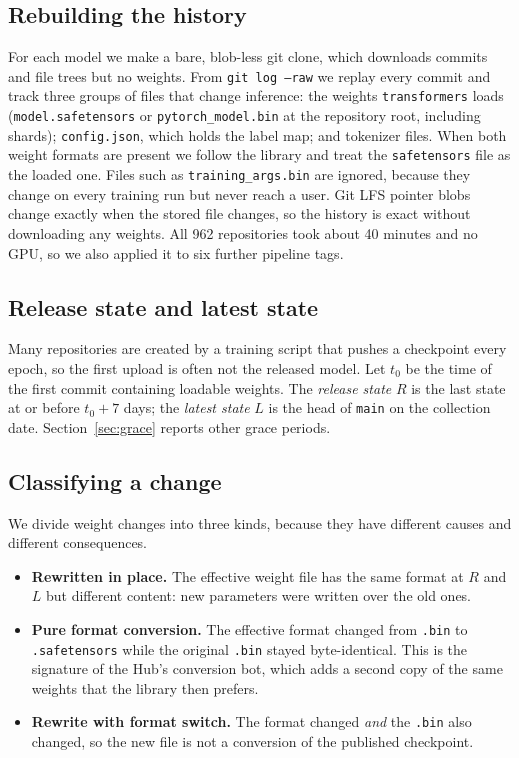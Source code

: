 \documentclass[conference]{IEEEtran}
\newcommand{\code}[1]{\texttt{#1}}
\begin{document}
\subsection{Rebuilding the history}
For each model we make a bare, blob-less git clone, which downloads commits and file trees but no weights. From \code{git log --raw} we replay every commit and track three groups of files that change inference: the weights \code{transformers} loads (\code{model.safetensors} or \code{pytorch\_model.bin} at the repository root, including shards); \code{config.json}, which holds the label map; and tokenizer files. When both weight formats are present we follow the library and treat the \code{safetensors} file as the loaded one. Files such as \code{training\_args.bin} are ignored, because they change on every training run but never reach a user. Git LFS pointer blobs change exactly when the stored file changes, so the history is exact without downloading any weights. All 962 repositories took about 40 minutes and no GPU, so we also applied it to six further pipeline tags.

\subsection{Release state and latest state}
Many repositories are created by a training script that pushes a checkpoint every epoch, so the first upload is often not the released model. Let $t_0$ be the time of the first commit containing loadable weights. The \emph{release state} $R$ is the last state at or before $t_0 + 7$ days; the \emph{latest state} $L$ is the head of \code{main} on the collection date. Section~\ref{sec:grace} reports other grace periods.

\subsection{Classifying a change}\label{sec:kinds}
We divide weight changes into three kinds, because they have different causes and different consequences.

\begin{itemize}
\item \textbf{Rewritten in place.} The effective weight file has the same format at $R$ and $L$ but different content: new parameters were written over the old ones.
\item \textbf{Pure format conversion.} The effective format changed from \code{.bin} to \code{.safetensors} while the original \code{.bin} stayed byte-identical. This is the signature of the Hub's conversion bot, which adds a second copy of the same weights that the library then prefers.
\item \textbf{Rewrite with format switch.} The format changed \emph{and} the \code{.bin} also changed, so the new file is not a conversion of the published checkpoint.
\end{itemize}
\end{document}
